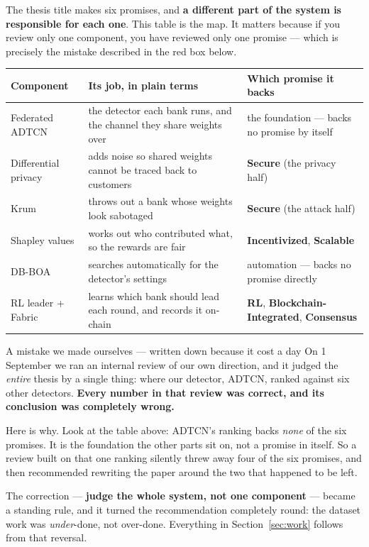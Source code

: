 \documentclass[11pt]{article}
\begin{document}
The thesis title makes six promises, and \textbf{a different part of the system is responsible for
each one}. This table is the map. It matters because if you review only one component, you have
reviewed only one promise --- which is precisely the mistake described in the red box below.

\begin{center}\small
\begin{tabularx}{\linewidth}{@{}p{3.5cm} p{5.0cm} X@{}}
\toprule
\textbf{Component} & \textbf{Its job, in plain terms} & \textbf{Which promise it backs} \\
\midrule
Federated ADTCN & the detector each bank runs, and the channel they share weights over & the foundation --- backs no promise by itself \\
Differential privacy & adds noise so shared weights cannot be traced back to customers & \textbf{Secure} (the privacy half) \\
Krum & throws out a bank whose weights look sabotaged & \textbf{Secure} (the attack half) \\
Shapley values & works out who contributed what, so the rewards are fair & \textbf{Incentivized}, \textbf{Scalable} \\
DB-BOA & searches automatically for the detector's settings & automation --- backs no promise directly \\
RL leader + Fabric & learns which bank should lead each round, and records it on-chain & \textbf{RL}, \textbf{Blockchain-Integrated}, \textbf{Consensus} \\
\bottomrule
\end{tabularx}
\end{center}

\begin{warnbox}{A mistake we made ourselves --- written down because it cost a day}
On 1 September we ran an internal review of our own direction, and it judged the \emph{entire} thesis
by a single thing: where our detector, ADTCN, ranked against six other detectors. \textbf{Every number
in that review was correct, and its conclusion was completely wrong.}

Here is why. Look at the table above: ADTCN's ranking backs \emph{none} of the six promises. It is the
foundation the other parts sit on, not a promise in itself. So a review built on that one ranking
silently threw away four of the six promises, and then recommended rewriting the paper around the two
that happened to be left.

The correction --- \textbf{judge the whole system, not one component} --- became a standing rule, and it
turned the recommendation completely round: the dataset work was \emph{under}-done, not over-done.
Everything in Section~\ref{sec:work} follows from that reversal.
\end{warnbox}
\end{document}
